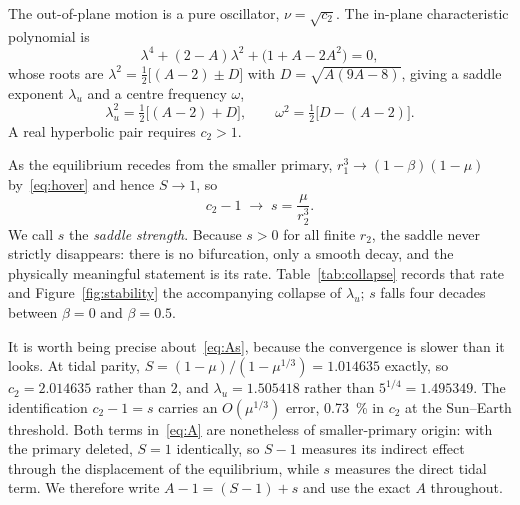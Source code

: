 \documentclass[11pt,a4paper]{article}
\begin{document}
The out-of-plane motion is a pure oscillator, $\nu=\sqrt{c_2}$. The in-plane
characteristic polynomial is
\begin{equation}
  \lambda^{4} + (2-A)\lambda^{2} + \bigl(1+A-2A^{2}\bigr) = 0 ,
  \label{eq:quartic}
\end{equation}
whose roots are $\lambda^{2}=\tfrac12\bigl[(A-2)\pm D\bigr]$ with
$D=\sqrt{A(9A-8)}$, giving a saddle exponent $\lambda_u$ and a centre frequency
$\omega$,
\begin{equation}
  \lambda_u^{2} = \tfrac12\bigl[(A-2)+D\bigr], \qquad
  \omega^{2} = \tfrac12\bigl[D-(A-2)\bigr].
  \label{eq:rates}
\end{equation}
A real hyperbolic pair requires $c_2>1$.

As the equilibrium recedes from the smaller primary, $r_1^3\to(1-\beta)(1-\mu)$
by~\eqref{eq:hover} and hence $S\to1$, so
\begin{equation}
  c_2 - 1 \;\longrightarrow\; s = \frac{\mu}{r_2^{3}} .
  \label{eq:As}
\end{equation}
We call $s$ the \emph{saddle strength}. Because $s>0$ for all finite $r_2$, the
saddle never strictly disappears: there is no bifurcation, only a smooth decay,
and the physically meaningful statement is its rate. Table~\ref{tab:collapse}
records that rate and Figure~\ref{fig:stability} the accompanying collapse of
$\lambda_u$; $s$ falls four decades between $\beta=0$ and $\beta=0.5$.

It is worth being precise about~\eqref{eq:As}, because the convergence is slower
than it looks. At tidal parity, $S=(1-\mu)/(1-\mu^{1/3})=1.014635$ exactly, so
$c_2=2.014635$ rather than $2$, and $\lambda_u=1.505418$ rather than
$5^{1/4}=1.495349$. The identification $c_2-1=s$ carries an $O(\mu^{1/3})$ error,
\SI{0.73}{\percent} in $c_2$ at the Sun--Earth threshold. Both terms
in~\eqref{eq:A} are nonetheless of smaller-primary origin: with the primary
deleted, $S=1$ identically, so $S-1$ measures its indirect effect through the
displacement of the equilibrium, while $s$ measures the direct tidal term. We
therefore write $A-1=(S-1)+s$ and use the exact $A$ throughout.
\end{document}
